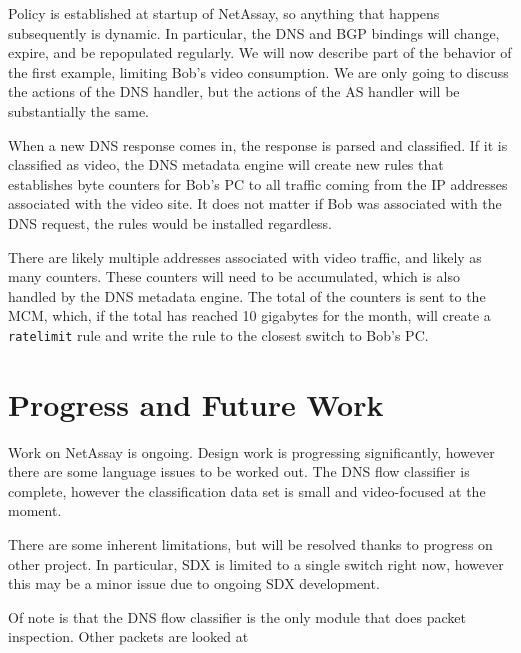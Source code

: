 \documentclass{sig-alternate}
\newcommand\tti[1]{\small\texttt{#1}\normalsize}
\newcommand\system{NetAssay}
\begin{document}


Policy is established at startup of \system{}, so anything that happens subsequently is dynamic. In particular, the DNS and BGP bindings will change, expire, and be repopulated regularly. We will now describe part of the behavior of the first example, limiting Bob's video consumption. We are only going to discuss the actions of the DNS handler, but the actions of the AS handler will be substantially the same.

When a new DNS response comes in, the response is parsed and classified. If it is classified as video, the DNS metadata engine will create new rules that establishes byte counters for Bob's PC to all traffic coming from the IP addresses associated with the video site. It does not matter if Bob was associated with the DNS request, the rules would be installed regardless.

There are likely multiple addresses associated with video traffic, and likely as many counters. These counters will need to be accumulated, which is also handled by the DNS metadata engine. The total of the counters is sent to the MCM, which, if the total has reached 10 gigabytes for the month, will create a \tti{ratelimit} rule and write the rule to the closest switch to Bob's PC.


\section{Progress and Future Work}
Work on \system{} is ongoing. Design work is progressing significantly, however there are some language issues to be worked out. The DNS flow classifier is complete, however the classification data set is small and video-focused at the moment. 

There are some inherent limitations, but will be resolved thanks to progress on other project. In particular, SDX is limited to a single switch right now, however this may be a minor issue due to ongoing SDX development.

Of note is that the DNS flow classifier is the only module that does packet inspection. Other packets are looked at
\end{document}
